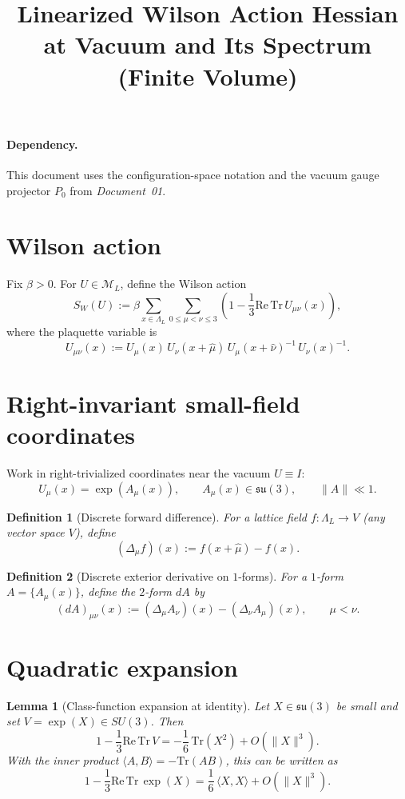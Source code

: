 \documentclass[11pt]{article}
\title{Linearized Wilson Action Hessian at Vacuum and Its Spectrum (Finite Volume)}
\date{}
\newtheorem{definition}{Definition}
\newtheorem{lemma}{Lemma}
\begin{document}
\maketitle

\paragraph{Dependency.}
This document uses the configuration-space notation and the vacuum gauge projector $P_0$ from \emph{Document~01}.

\section{Wilson action}

Fix $\beta>0$.  For $U\in\mathcal M_L$, define the Wilson action
\[
S_W(U) := \beta\sum_{x\in\Lambda_L}\sum_{0\le \mu<\nu\le 3}\left(1-\frac13\mathrm{Re}\,\mathrm{Tr}\,U_{\mu\nu}(x)\right),
\]
where the plaquette variable is
\[
U_{\mu\nu}(x):=U_\mu(x)\,U_\nu(x+\hat\mu)\,U_\mu(x+\hat\nu)^{-1}\,U_\nu(x)^{-1}.
\]

\section{Right-invariant small-field coordinates}

Work in right-trivialized coordinates near the vacuum $U\equiv I$:
\[
U_\mu(x)=\exp(A_\mu(x)),\qquad A_\mu(x)\in \mathfrak{su}(3),\qquad \|A\|\ll 1.
\]

\begin{definition}[Discrete forward difference]
For a lattice field $f:\Lambda_L\to V$ (any vector space $V$), define
\[
(\Delta_\mu f)(x):=f(x+\hat\mu)-f(x).
\]
\end{definition}

\begin{definition}[Discrete exterior derivative on $1$-forms]
For a $1$-form $A=\{A_\mu(x)\}$, define the $2$-form $dA$ by
\[
(dA)_{\mu\nu}(x):=(\Delta_\mu A_\nu)(x)-(\Delta_\nu A_\mu)(x),\qquad \mu<\nu.
\]
\end{definition}

\section{Quadratic expansion}

\begin{lemma}[Class-function expansion at identity]\label{lem:class}
Let $X\in\mathfrak{su}(3)$ be small and set $V=\exp(X)\in SU(3)$.
Then
\[
1-\frac13\mathrm{Re}\,\mathrm{Tr}\,V = -\frac16\,\mathrm{Tr}(X^2) + O(\|X\|^3).
\]
With the inner product $\langle A,B\rangle=-\mathrm{Tr}(AB)$, this can be written as
\[
1-\frac13\mathrm{Re}\,\mathrm{Tr}\,\exp(X) = \frac16\,\langle X,X\rangle + O(\|X\|^3).
\]
\end{lemma}
\end{document}
